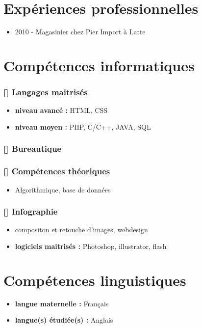\documentclass[a4paper]{article}
\begin{document}
\section{Expériences professionnelles}

\begin{itemize}
\item 2010 - Magasinier chez Pier Import à Latte
\end{itemize}

\section*{Compétences informatiques}

\subsubsection*{[] Langages maitrisés}

\begin{itemize}
\item\textbf{niveau avancé :} HTML, CSS
\item\textbf{niveau moyen :} PHP, C/C++, JAVA, SQL
\end{itemize}

\subsubsection*{[] Bureautique}

\subsubsection*{[] Compétences théoriques}

\begin{itemize}
\item Algorithmique, base de données
\end{itemize}

\subsubsection*{[] Infographie}
\begin{itemize}
\item compositon et retouche d'images, webdesign
\item\textbf{logiciels maitrisés :} Photoshop, illustrator, flash
\end{itemize}

\section*{Compétences linguistiques}

\begin{itemize}
\item\textbf{langue maternelle :} Français
\item\textbf{langue(s) étudiée(s) :} Anglais
\end{itemize}
\end{document}
